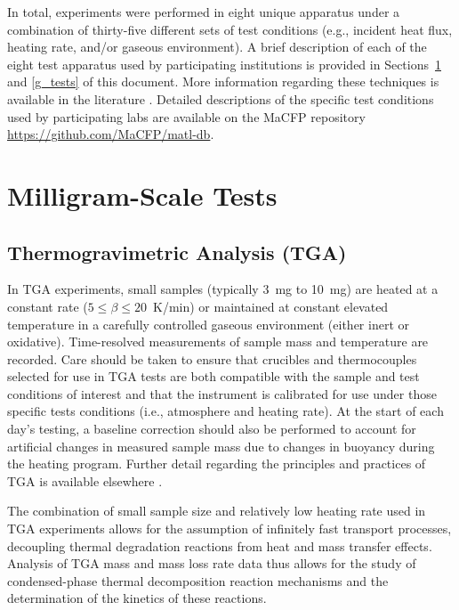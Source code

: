 \documentclass{book}
\begin{document}
In total, experiments were performed in eight unique apparatus under a combination of thirty-five different sets of test conditions (e.g., incident heat flux, heating rate, and/or gaseous environment). A brief description of each of the eight test apparatus used by participating institutions is provided in Sections~\ref{mg_tests} and \ref{g_tests} of this document. More information regarding these techniques is available in the literature \cite{brown2001introduction,SFPEHandbookThermalDecomp}. Detailed descriptions of the specific test conditions used by participating labs are available on the MaCFP repository \href{https://github.com/MaCFP/matl-db}{https://github.com/MaCFP/matl-db}.


\section{Milligram-Scale Tests}
\label{mg_tests}

\subsection{Thermogravimetric Analysis (TGA)}

In TGA experiments, small samples (typically 3~mg to 10~mg) are heated at a constant rate ($5\le\beta\le20$~K/min) or maintained at constant elevated temperature in a carefully controlled gaseous environment (either inert or oxidative). Time-resolved measurements of sample mass and temperature are recorded. Care should be taken to ensure that crucibles and thermocouples selected for use in TGA tests are both compatible with the sample and test conditions of interest and that the instrument is calibrated for use under those specific tests conditions (i.e., atmosphere and heating rate). At the start of each day’s testing, a baseline correction should also be performed to account for artificial changes in measured sample mass due to changes in buoyancy during the heating program. Further detail regarding the principles and practices of TGA is available elsewhere \cite{coats1963thermogravimetric}.

The combination of small sample size and relatively low heating rate used in TGA experiments allows for the assumption of infinitely fast transport processes, decoupling thermal degradation reactions from heat and mass transfer effects. Analysis of TGA mass and mass loss rate data thus allows for the study of condensed-phase thermal decomposition reaction mechanisms and the determination of the kinetics of these reactions.
\end{document}
